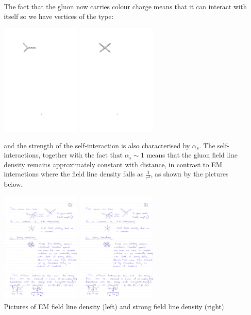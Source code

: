 The fact that the gluon now carries colour charge means that it can interact with itself so we have vertices of the type:
\begin{center}
\includegraphics[width=0.3\textwidth]{fig/strongforce/gluon_three.pdf}
\includegraphics[width=0.3\textwidth]{fig/strongforce/gluon_four.pdf}
\end{center}
and the strength of the self-interaction is also characterised by $\alpha_s$. 
The self-interactions, together with the fact that $\alpha_s\sim 1$ means that the gluon field line density remains approximately constant with distance, in contrast to EM interactions where the field line density falls as $\frac{1}{r^2}$, as shown by the pictures below.
\begin{center}
\includegraphics[width=0.3\textwidth]{fig/strongforce/em_line_density.pdf}
\includegraphics[width=0.3\textwidth]{fig/strongforce/strong_line_denstiy.pdf}\\
Pictures of EM field line density (left) and strong field line density (right)
\end{center}
